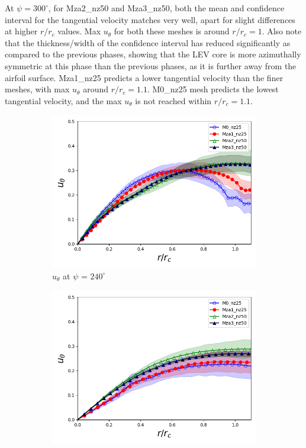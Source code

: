 At $\psi = 300^\circ$, for Mza2\_nz50 and Mza3\_nz50, both the mean and confidence interval for the tangential velocity matches very well, apart for slight differences at higher $r/r_c$ values. 
Max $u_\theta$ for both these meshes is around $r/r_c= 1$.
Also note that the thickness/width of the confidence interval has reduced significantly as compared to the previous phases, showing that the LEV core is more azimuthally symmetric at this phase than the previous phases, as it is further away from the airfoil surface.
Mza1\_nz25 predicts a lower tangential velocity than the finer meshes, with max $u_\theta$ around $r/r_c= 1.1$. M0\_nz25 mesh predicts the lowest tangential velocity, and the max $u_\theta$ is not reached within $r/r_c= 1.1$.

\begin{figure}[H]
	\centering
	\begin{subfigure}[b]{0.475\textwidth}
	\centering
	\includegraphics[width=1\textwidth]{figures/zonal_adapt_results/LEV/u_theta/phase_240.png}
	\caption{ $u_\theta$ at $\psi$ = $240^\circ$}
	\label{fig:zonal_utheta_240}
	\end{subfigure}
	\begin{subfigure}[b]{0.475\textwidth}
	\centering
	\includegraphics[width=1\textwidth]{figures/zonal_adapt_results/LEV/u_theta/phase_270.png}

\end{subfigure}
\end{figure}
